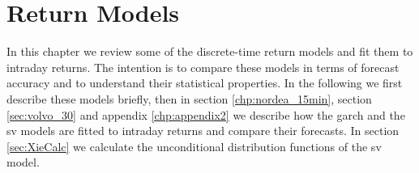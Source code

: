 \chapter{Return Models}\label{chp:PriceModels}
In this chapter we review some of the discrete-time return models and
fit them to intraday returns. The intention is to compare these models
in terms of forecast accuracy and to understand their statistical
properties. In the following we first describe these models briefly,
then in section \ref{chp:nordea_15min}, section \ref{sec:volvo_30} and appendix
\ref{chp:appendix2} we describe how the \gls{garch} and the \gls{sv} models
are fitted to intraday returns and compare their forecasts. In section
\ref{sec:XieCalc} we calculate the unconditional distribution
functions of the \gls{sv} model.


